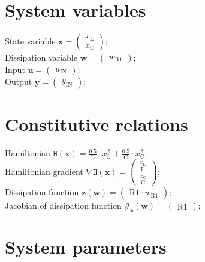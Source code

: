 \documentclass[11pt, oneside]{article}      %
\begin{document}
\section{System variables}
%
State variable $ \mathbf{x} = \left(\begin{array}{c}x_{\mathrm{L}}\\x_{\mathrm{C}}\end{array}\right) ; $ 
%
\\
%
Dissipation variable $ \mathbf{w} = \left(\begin{array}{c}w_{\mathrm{R1}}\end{array}\right) ; $ 
%
\\
%
Input $ \mathbf{u} = \left(\begin{array}{c}u_{\mathrm{IN}}\end{array}\right) ; $ 
%
\\
%
Output $ \mathbf{y} = \left(\begin{array}{c}y_{\mathrm{IN}}\end{array}\right) ; $ 
%
\\
%
%
\section{Constitutive relations}
%
Hamiltonian $ \mathtt{H}(\mathbf{x}) = \frac{0.5}{\mathrm{L}} \cdot x_{\mathrm{L}}^{2} + \frac{0.5}{\mathrm{C}} \cdot x_{\mathrm{C}}^{2} ; $ 
%
\\
%
Hamiltonian gradient $ \nabla \mathtt{H}(\mathbf{x}) = \left(\begin{array}{c}\frac{x_{\mathrm{L}}}{\mathrm{L}}\\\frac{x_{\mathrm{C}}}{\mathrm{C}}\end{array}\right) ; $ 
%
\\
%
Dissipation function $ \mathbf{z}(\mathbf{w}) = \left(\begin{array}{c}\mathrm{R1} \cdot w_{\mathrm{R1}}\end{array}\right) ; $ 
%
\\
%
Jacobian of dissipation function $ \mathcal{J}_{\mathbf{z}}(\mathbf{w}) = \left(\begin{array}{c}\mathrm{R1}\end{array}\right) ; $ 
%
\\
%
%
\section{System parameters}
%
%
\end{document}
